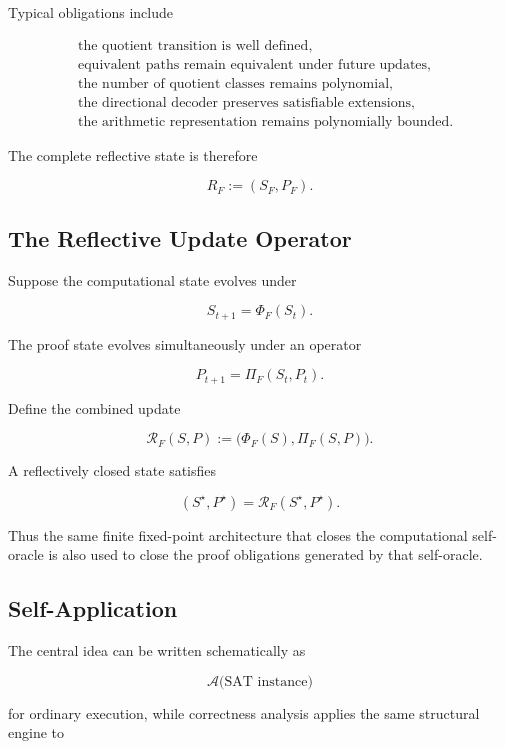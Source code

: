 \documentclass[11pt]{article}
\theoremstyle{plain}
\theoremstyle{definition}
\begin{document}
Typical obligations include

\[
\begin{aligned}
&\text{the quotient transition is well defined},\\
&\text{equivalent paths remain equivalent under future updates},\\
&\text{the number of quotient classes remains polynomial},\\
&\text{the directional decoder preserves satisfiable extensions},\\
&\text{the arithmetic representation remains polynomially bounded}.
\end{aligned}
\]

The complete reflective state is therefore

\[
    R_F
    :=
    (S_F,P_F).
\]

\subsection{The Reflective Update Operator}

Suppose the computational state evolves under

\[
    S_{t+1}
    =
    \Phi_F(S_t).
\]

The proof state evolves simultaneously under an operator

\[
    P_{t+1}
    =
    \Pi_F(S_t,P_t).
\]

Define the combined update

\[
    \mathcal{R}_F(S,P)
    :=
    \bigl(
        \Phi_F(S),
        \Pi_F(S,P)
    \bigr).
\]

A reflectively closed state satisfies

\[
\boxed{
    (S^\star,P^\star)
    =
    \mathcal{R}_F(S^\star,P^\star).
}
\]

Thus the same finite fixed-point architecture that closes the computational
self-oracle is also used to close the proof obligations generated by that
self-oracle.

\subsection{Self-Application}

The central idea can be written schematically as

\[
\boxed{
\mathcal{A}
\bigl(
    \text{SAT instance}
\bigr)
}
\]

for ordinary execution, while correctness analysis applies the same
structural engine to
\end{document}

